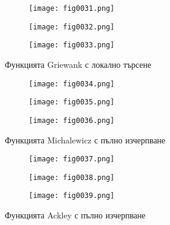 \begin{figure}[H]
  \begin{subfigure}{0.31\textwidth}
  \texttt{[image: fig0031.png]}
  \label{fig0031}
  \end{subfigure}
  \begin{subfigure}{0.31\textwidth}
  \texttt{[image: fig0032.png]}
  \label{fig0032}
  \end{subfigure}
  \begin{subfigure}{0.31\textwidth}
  \texttt{[image: fig0033.png]}
  \label{fig0033}
  \end{subfigure}
  \caption{Функцията Griewank с локално търсене}
\end{figure}

\begin{figure}[H]
  \begin{subfigure}{0.31\textwidth}
  \texttt{[image: fig0034.png]}
  \label{fig0034}
  \end{subfigure}
  \begin{subfigure}{0.31\textwidth}
  \texttt{[image: fig0035.png]}
  \label{fig0035}
  \end{subfigure}
  \begin{subfigure}{0.31\textwidth}
  \texttt{[image: fig0036.png]}
  \label{fig0036}
  \end{subfigure}
  \caption{Функцията Michalewicz с пълно изчерпване}
\end{figure}

\begin{figure}[H]
  \begin{subfigure}{0.31\textwidth}
  \texttt{[image: fig0037.png]}
  \label{fig0037}
  \end{subfigure}
  \begin{subfigure}{0.31\textwidth}
  \texttt{[image: fig0038.png]}
  \label{fig0038}
  \end{subfigure}
  \begin{subfigure}{0.31\textwidth}
  \texttt{[image: fig0039.png]}
  \label{fig0039}
  \end{subfigure}
  \caption{Функцията Ackley с пълно изчерпване}
\end{figure}

